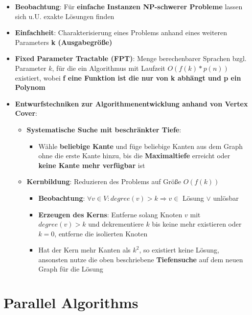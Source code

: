 \documentclass[10pt,a4paper]{article}
\begin{document}
	\begin{itemize}
		\item \textbf{Beobachtung}: Für \textbf{einfache Instanzen NP-schwerer Probleme} lassen sich u.U. exakte Lösungen finden
		\item \textbf{Einfachheit}: Charakterisierung eines Problems anhand eines weiteren Parameters \textbf{k (Ausgabegröße)}
		\item \textbf{Fixed Parameter Tractable (FPT)}: Menge berechenbarer Sprachen bzgl. Parameter $k$, für die ein Algorithmus mit Laufzeit $O(f(k) * p(n))$ existiert, wobei \textbf{f eine Funktion ist die nur von k abhängt und p ein Polynom}
		\item \textbf{Entwurfstechniken zur Algorithmenentwicklung anhand von Vertex Cover}:
		\begin{itemize}
			\item \textbf{Systematische Suche mit beschränkter Tiefe}:
		 	\begin{itemize}
		 		\item Wähle \textbf{beliebige Kante} und füge beliebige Kanten aus dem Graph ohne die erste Kante hinzu, bis die \textbf{Maximaltiefe} erreicht oder \textbf{keine Kante mehr verfügbar} ist
		 	\end{itemize}
		 	\item \textbf{Kernbildung}: Reduzieren des Problems auf Größe $O(f(k))$
		 	\begin{itemize}
		 		\item \textbf{Beobachtung}: $\forall v \in V: degree(v) > k \Rightarrow v \in$ Lösung $\lor$ unlösbar
		 		\item \textbf{Erzeugen des Kerns}: Entferne solang Knoten $v$ mit $degree(v) > k$ und dekrementiere $k$ bis keine mehr existieren oder $k = 0$, entferne die isolierten Knoten
		 		\item Hat der Kern mehr Kanten als $k^2$, so existiert keine Lösung, ansonsten nutze die oben beschriebene \textbf{Tiefensuche} auf dem neuen Graph für die Lösung
		 	\end{itemize}
		 \end{itemize} 
	\end{itemize}

	\section{Parallel Algorithms}
	\label{pa:sec:parallel_algorithms}
	
\end{document}
